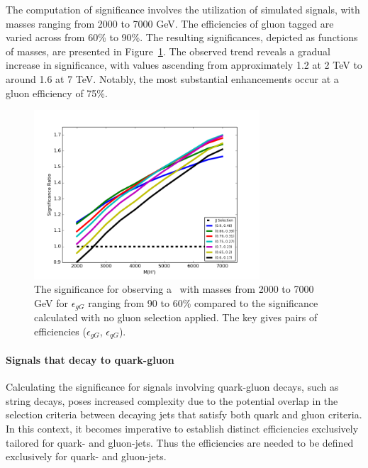The computation of significance involves the utilization of simulated \Hprime signals, with masses ranging from 2000 to 7000 GeV. The efficiencies of gluon tagged are varied across from 60\% to 90\%. The resulting significances, depicted as functions of \Hprime masses, are presented in Figure~\ref{fig:GluonSignalSignificance}. The observed trend reveals a gradual increase in significance, with values ascending from approximately 1.2 at 2 TeV to around 1.6 at 7 TeV. Notably, the most substantial enhancements occur at a gluon efficiency of 75\%.


\begin{figure}[htb]
 \centering
\includegraphics[width=0.75\textwidth]{fig/tagging/GluonSignalSignificance.png}
\caption{ The significance for observing a \Hprime\ with masses from 2000 to 7000 GeV
for $\epsilon_{gG}$ ranging from 90 to 60\% compared to the significance calculated with no gluon selection applied. The key gives pairs of efficiencies ($\epsilon_{gG}$, $\epsilon_{qG}$).
  \label{fig:GluonSignalSignificance}}
\end{figure}


\paragraph{Signals that decay to quark-gluon\\}

Calculating the significance for signals involving quark-gluon decays, such as string decays, poses increased complexity due to the potential overlap in the selection criteria between decaying jets that satisfy both quark and gluon criteria. In this context, it becomes imperative to establish distinct efficiencies exclusively tailored for quark- and gluon-jets. Thus the efficiencies are needed to be defined exclusively for quark- and gluon-jets.

